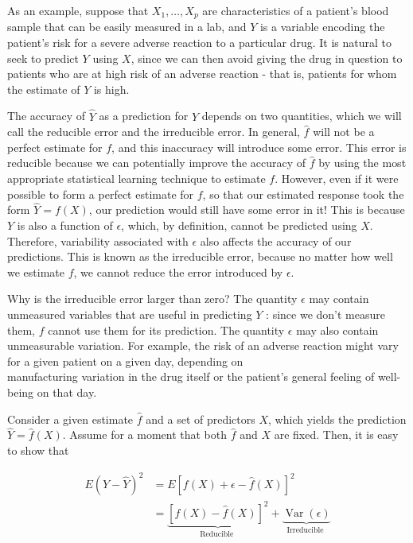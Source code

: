 \documentclass[10pt]{article}
\begin{document}
As an example, suppose that $X_{1}, \ldots, X_{p}$ are characteristics of a patient's blood sample that can be easily measured in a lab, and $Y$ is a variable encoding the patient's risk for a severe adverse reaction to a particular drug. It is natural to seek to predict $Y$ using $X$, since we can then avoid giving the drug in question to patients who are at high risk of an adverse reaction - that is, patients for whom the estimate of $Y$ is high.

The accuracy of $\hat{Y}$ as a prediction for $Y$ depends on two quantities, which we will call the reducible error and the irreducible error. In general, $\hat{f}$ will not be a perfect estimate for $f$, and this inaccuracy will introduce some error. This error is reducible because we can potentially improve the accuracy of $\hat{f}$ by using the most appropriate statistical learning technique to estimate $f$. However, even if it were possible to form a perfect estimate for $f$, so that our estimated response took the form $\hat{Y}=f(X)$, our prediction would still have some error in it! This is because $Y$ is also a function of $\epsilon$, which, by definition, cannot be predicted using $X$. Therefore, variability associated with $\epsilon$ also affects the accuracy of our predictions. This is known as the irreducible error, because no matter how well we estimate $f$, we cannot reduce the error introduced by $\epsilon$.

Why is the irreducible error larger than zero? The quantity $\epsilon$ may contain unmeasured variables that are useful in predicting $Y$ : since we don't measure them, $f$ cannot use them for its prediction. The quantity $\epsilon$ may also contain unmeasurable variation. For example, the risk of an adverse reaction might vary for a given patient on a given day, depending on\\
manufacturing variation in the drug itself or the patient's general feeling of well-being on that day.

Consider a given estimate $\hat{f}$ and a set of predictors $X$, which yields the prediction $\hat{Y}=\hat{f}(X)$. Assume for a moment that both $\hat{f}$ and $X$ are fixed. Then, it is easy to show that


\begin{align*}
E(Y-\hat{Y})^{2} & =E[f(X)+\epsilon-\hat{f}(X)]^{2} \\
& =\underbrace{[f(X)-\hat{f}(X)]^{2}}_{\text {Reducible }}+\underbrace{\operatorname{Var}(\epsilon)}_{\text {Irreducible }} \tag{2.3}
\end{align*}
\end{document}
